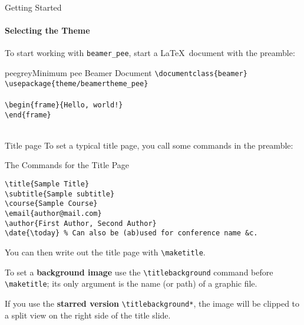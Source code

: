 \begin{frame}[fragile]{Getting Started}
\framesubtitle{Selecting the Theme}
To start working with \texttt{beamer\_pee}, start a \LaTeX\ document with the preamble:
\begin{colorblock}[black]{peegrey}{Minimum pee Beamer Document}
    \verb|\documentclass{beamer}|\\
    \verb|\usepackage{theme/beamertheme_pee}|\\
    \verb||\\
    \verb|\begin{frame}{Hello, world!}|\\
    \verb|\end{frame}|\\
    \verb||\\
\end{colorblock}
\end{frame}


\begin{frame}[fragile]{Title page}
To set a typical title page, you call some commands in the preamble:
\begin{block}{The Commands for the Title Page}
\begin{verbatim}
\title{Sample Title}
\subtitle{Sample subtitle}
\course{Sample Course}
\email{author@mail.com}
\author{First Author, Second Author}
\date{\today} % Can also be (ab)used for conference name &c.
\end{verbatim}
\end{block}
You can then write out the title page with \verb|\maketitle|.

To set a \textbf{background image} use the \verb|\titlebackground| command  before \verb|\maketitle|; its only argument is the name (or path) of a graphic file.

If you use the \textbf{starred version} \verb|\titlebackground*|, the image  will be clipped to a split view on the right side of the title slide.
\end{frame}


